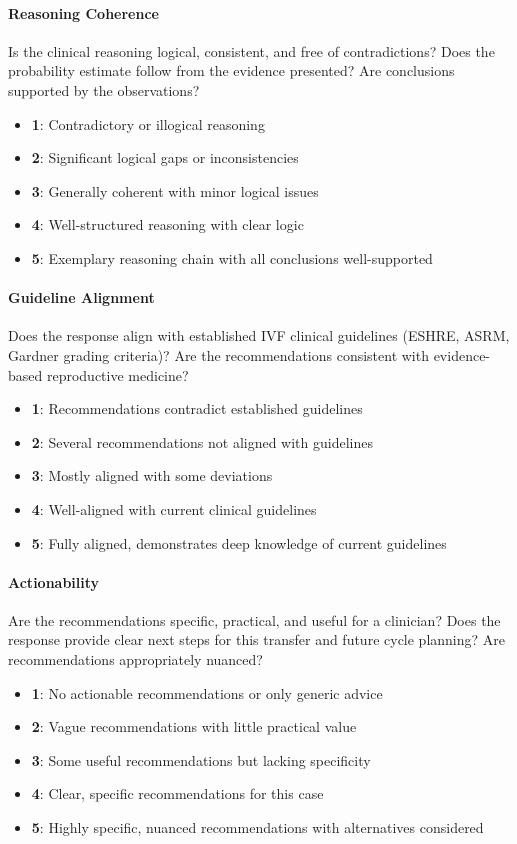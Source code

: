 \documentclass[11pt]{article}
\begin{document}
\paragraph{Reasoning Coherence}
Is the clinical reasoning logical, consistent, and free of contradictions? Does the probability estimate follow from the evidence presented? Are conclusions supported by the observations?
\begin{itemize}
\item \textbf{1}: Contradictory or illogical reasoning
\item \textbf{2}: Significant logical gaps or inconsistencies
\item \textbf{3}: Generally coherent with minor logical issues
\item \textbf{4}: Well-structured reasoning with clear logic
\item \textbf{5}: Exemplary reasoning chain with all conclusions well-supported
\end{itemize}

\paragraph{Guideline Alignment}
Does the response align with established IVF clinical guidelines (ESHRE, ASRM, Gardner grading criteria)? Are the recommendations consistent with evidence-based reproductive medicine?
\begin{itemize}
\item \textbf{1}: Recommendations contradict established guidelines
\item \textbf{2}: Several recommendations not aligned with guidelines
\item \textbf{3}: Mostly aligned with some deviations
\item \textbf{4}: Well-aligned with current clinical guidelines
\item \textbf{5}: Fully aligned, demonstrates deep knowledge of current guidelines
\end{itemize}

\paragraph{Actionability}
Are the recommendations specific, practical, and useful for a clinician? Does the response provide clear next steps for this transfer and future cycle planning? Are recommendations appropriately nuanced?
\begin{itemize}
\item \textbf{1}: No actionable recommendations or only generic advice
\item \textbf{2}: Vague recommendations with little practical value
\item \textbf{3}: Some useful recommendations but lacking specificity
\item \textbf{4}: Clear, specific recommendations for this case
\item \textbf{5}: Highly specific, nuanced recommendations with alternatives considered
\end{itemize}
\end{document}

